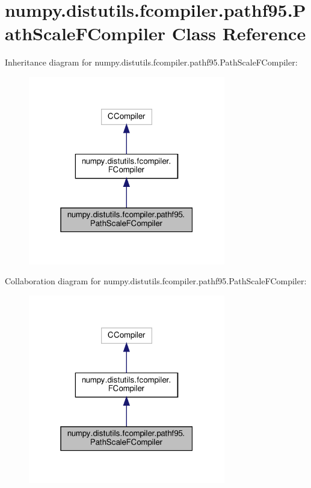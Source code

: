 \hypertarget{classnumpy_1_1distutils_1_1fcompiler_1_1pathf95_1_1PathScaleFCompiler}{}\section{numpy.\+distutils.\+fcompiler.\+pathf95.\+Path\+Scale\+F\+Compiler Class Reference}
\label{classnumpy_1_1distutils_1_1fcompiler_1_1pathf95_1_1PathScaleFCompiler}


Inheritance diagram for numpy.\+distutils.\+fcompiler.\+pathf95.\+Path\+Scale\+F\+Compiler\+:
\nopagebreak
\begin{figure}[H]
\begin{center}
\leavevmode
\includegraphics[width=244pt]{classnumpy_1_1distutils_1_1fcompiler_1_1pathf95_1_1PathScaleFCompiler__inherit__graph}
\end{center}
\end{figure}


Collaboration diagram for numpy.\+distutils.\+fcompiler.\+pathf95.\+Path\+Scale\+F\+Compiler\+:
\nopagebreak
\begin{figure}[H]
\begin{center}
\leavevmode
\includegraphics[width=244pt]{classnumpy_1_1distutils_1_1fcompiler_1_1pathf95_1_1PathScaleFCompiler__coll__graph}
\end{center}
\end{figure}
